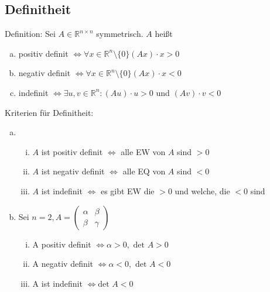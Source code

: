 \documentclass{article}
\begin{document}
\subsection{Definitheit}

Definition: Sei $A \in \mathbb{R}^{n \times n}$ symmetrisch. $A$ heißt
\begin{enumerate} [a)]
    \item positiv definit $\Leftrightarrow \forall x \in \mathbb{R}^n \setminus \{0\} (Ax) \cdot x > 0$
    \item negativ definit $ \Leftrightarrow \forall x \in \mathbb{R}^n \setminus \{0\} (Ax) \cdot x < 0$
    \item indefinit $\Leftrightarrow \exists u,v \in \mathbb{R}^n: (Au) \cdot u > 0$ und $(Av) \cdot v < 0$
\end{enumerate}
\vspace{0.5cm}

Kriterien für Definitheit:
\begin{enumerate} [a)]
    \item \begin{enumerate} [i)]
        \item $A$ ist positiv definit $\Leftrightarrow$ alle EW von $A$ sind $> 0$
        \item $A$ ist negativ definit $\Leftrightarrow$ alle EQ von $A$ sind $< 0$
        \item $A$ ist indefinit $\Leftrightarrow$ es gibt EW die $> 0$ und welche, die $< 0$ sind
    \end{enumerate}
    \item Sei $n=2, A = \begin{pmatrix} \alpha & \beta \\ \beta & \gamma\end{pmatrix}$
    \begin{enumerate} [i)]
        \item A positiv definit $\Leftrightarrow \alpha > 0, \text{ det } A > 0$
        \item A negativ definit $\Leftrightarrow \alpha < 0, \text{ det } A < 0$
        \item A ist indefinit $\Leftrightarrow \text{det } A < 0$
    \end{enumerate}
\end{enumerate}
\end{document}
